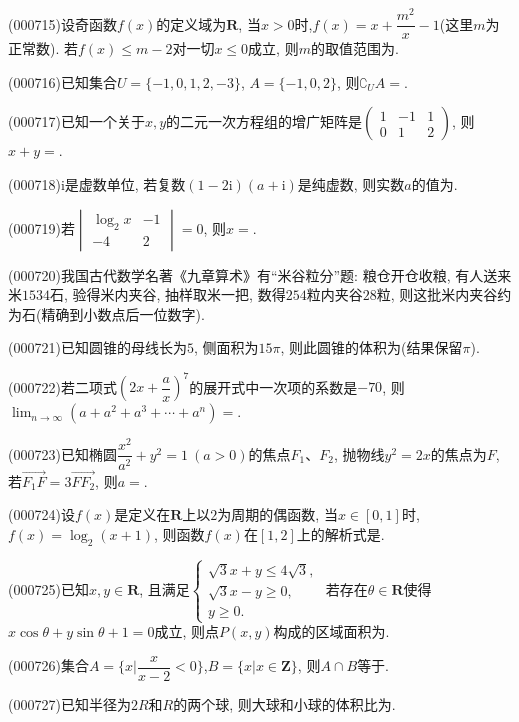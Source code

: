 \item (000715)设奇函数$f(x)$的定义域为$\mathbf{R}$, 当$x>0$时,$f(x)=x+\dfrac{m^2}x-1$(这里$m$为正常数). 若$f(x)\le m-2$对一切$x\le 0$成立, 则$m$的取值范围为.
\item (000716)已知集合$U=\{-1,0,1,2,-3\}$, $A=\{-1,0,2\}$, 则$\complement_U A=$.
\item (000717)已知一个关于$x,y$的二元一次方程组的增广矩阵是$\begin{pmatrix} 1 & -1 & 1  \\ 0 & 1 & 2 \end{pmatrix}$, 则$x+y=$.
\item (000718)$\mathrm{i}$是虚数单位, 若复数$(1-2\mathrm{i})(a+\mathrm{i})$是纯虚数, 则实数$a$的值为.
\item (000719)若$\begin{vmatrix} \log_2 x & -1  \\ -4 & 2  \end{vmatrix}=0$, 则$x=$.
\item (000720)我国古代数学名著《九章算术》有``米谷粒分''题: 粮仓开仓收粮, 有人送来米$1534$石, 验得米内夹谷, 抽样取米一把, 数得$254$粒内夹谷$28$粒, 则这批米内夹谷约为石(精确到小数点后一位数字).
\item (000721)已知圆锥的母线长为$5$, 侧面积为$15\pi$, 则此圆锥的体积为(结果保留$\pi$).
\item (000722)若二项式$(2x+\dfrac ax)^7$的展开式中一次项的系数是$-70$, 则$\displaystyle\lim_{n\to\infty}(a+a^2+a^3+\cdots+a^n)=$.
\item (000723)已知椭圆$\dfrac{x^2}{a^2}+y^2=1 \ (a>0)$的焦点$F_1$、$F_2$, 抛物线${y^2}=2x$的焦点为$F$, 若$\overrightarrow{F_1F}=3 \overrightarrow{FF_2}$, 则$a=$.
\item (000724)设$f(x)$是定义在$\mathbf{R}$上以$2$为周期的偶函数, 当$x\in [0,1]$时, $f(x)=\log_2(x+1)$, 则函数$f(x)$在$[1,2]$上的解析式是.
\item (000725)已知$x,y\in \mathbf{R}$, 且满足$\begin{cases} \sqrt3x+y\le 4 \sqrt3, \\  \sqrt3x-y\ge 0,\\ y\ge 0. \end{cases}$ 若存在$\theta \in \mathbf{R}$使得$x\cos \theta +y\sin \theta +1=0$成立, 则点$P(x,y)$构成的区域面积为.
\item (000726)集合$A=\{x|\dfrac x{x-2}<0\}$,$B=\{x|x\in \mathbf{Z}\}$, 则$A\cap B$等于.
\item (000727)已知半径为$2R$和$R$的两个球, 则大球和小球的体积比为.

